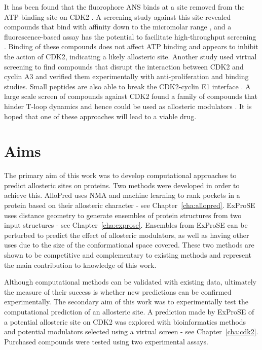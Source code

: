 It has been found that the fluorophore ANS binds at a site removed from the ATP-binding site on CDK2 \cite{Betzi2011}.
A screening study against this site revealed compounds that bind with affinity down to the micromolar range \cite{Rastelli2014}, and a fluorescence-based assay has the potential to facilitate high-throughput screening \cite{Martin2012}.
Binding of these compounds does not affect ATP binding and appears to inhibit the action of CDK2, indicating a likely allosteric site.
Another study used virtual screening to find compounds that disrupt the interaction between CDK2 and cyclin A3 \cite{Hu2015} and verified them experimentally with anti-proliferation and binding studies.
Small peptides are also able to break the CDK2-cyclin E1 interface \cite{Chen2014}.
A large scale screen of compounds against CDK2 found a family of compounds that hinder T-loop dynamics and hence could be used as allosteric modulators \cite{Pellerano2017}.
It is hoped that one of these approaches will lead to a viable drug.


\section{Aims}
\label{sec:introduction_aims}

The primary aim of this work was to develop computational approaches to predict allosteric sites on proteins.
Two methods were developed in order to achieve this.
AlloPred uses NMA and machine learning to rank pockets in a protein based on their allosteric character - see Chapter~\ref{cha:allopred}.
ExProSE uses distance geometry to generate ensembles of protein structures from two input structures - see Chapter~\ref{cha:exprose}.
Ensembles from ExProSE can be perturbed to predict the effect of allosteric modulators, as well as having other uses due to the size of the conformational space covered.
These two methods are shown to be competitive and complementary to existing methods and represent the main contribution to knowledge of this work.

Although computational methods can be validated with existing data, ultimately the measure of their success is whether new predictions can be confirmed experimentally.
The secondary aim of this work was to experimentally test the computational prediction of an allosteric site.
A prediction made by ExProSE of a potential allosteric site on CDK2 was explored with bioinformatics methods and potential modulators selected using a virtual screen - see Chapter~\ref{cha:cdk2}.
Purchased compounds were tested using two experimental assays.

